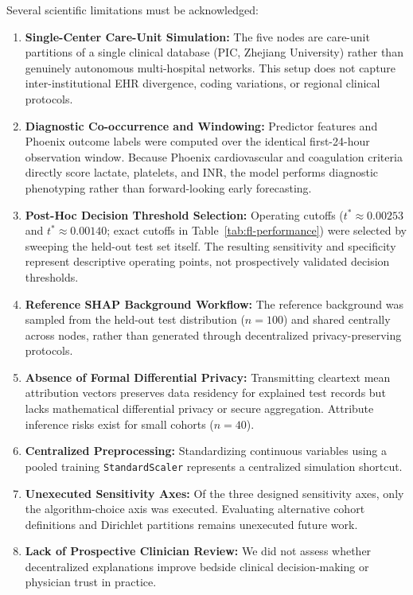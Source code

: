 \documentclass[runningheads]{llncs}
\begin{document}
Several scientific limitations must be acknowledged:
\begin{enumerate}
\item \textbf{Single-Center Care-Unit Simulation:} The five nodes are care-unit partitions of a single clinical database (PIC, Zhejiang University) rather than genuinely autonomous multi-hospital networks. This setup does not capture inter-institutional EHR divergence, coding variations, or regional clinical protocols.
\item \textbf{Diagnostic Co-occurrence and Windowing:} Predictor features and Phoenix outcome labels were computed over the identical first-24-hour observation window. Because Phoenix cardiovascular and coagulation criteria directly score lactate, platelets, and INR, the model performs diagnostic phenotyping rather than forward-looking early forecasting.
\item \textbf{Post-Hoc Decision Threshold Selection:} Operating cutoffs ($t^* \approx 0.00253$ and $t^* \approx 0.00140$; exact cutoffs in Table~\ref{tab:fl-performance}) were selected by sweeping the held-out test set itself. The resulting sensitivity and specificity represent descriptive operating points, not prospectively validated decision thresholds.
\item \textbf{Reference SHAP Background Workflow:} The reference background was sampled from the held-out test distribution ($n=100$) and shared centrally across nodes, rather than generated through decentralized privacy-preserving protocols.
\item \textbf{Absence of Formal Differential Privacy:} Transmitting cleartext mean attribution vectors preserves data residency for explained test records but lacks mathematical differential privacy or secure aggregation. Attribute inference risks exist for small cohorts ($n=40$).
\item \textbf{Centralized Preprocessing:} Standardizing continuous variables using a pooled training \texttt{StandardScaler} represents a centralized simulation shortcut.
\item \textbf{Unexecuted Sensitivity Axes:} Of the three designed sensitivity axes, only the algorithm-choice axis was executed. Evaluating alternative cohort definitions and Dirichlet partitions remains unexecuted future work.
\item \textbf{Lack of Prospective Clinician Review:} We did not assess whether decentralized explanations improve bedside clinical decision-making or physician trust in practice.
\end{enumerate}
\end{document}

